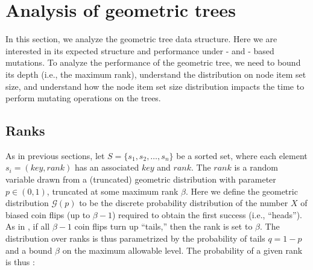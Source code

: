 \documentclass{article}
\begin{document}
\begin{algorithm}[!htb]
    \caption{Delete for geometric trees}\label{alg:delete-geometric}
    \DontPrintSemicolon

\end{algorithm}

\section{Analysis of geometric trees}

In this section, we analyze the geometric tree data structure. Here we are interested in its expected structure and performance under \zip- and \unzip- based mutations. To analyze the performance of the geometric tree, we need to bound its depth (i.e., the maximum rank), understand the distribution on node item set size, and understand how the node item set size distribution impacts the time to perform mutating operations on the trees.

\subsection{Ranks}

As in previous sections, let $S = \{s_1, s_2, \ldots, s_n\}$ be a sorted set, where each element $s_i = \left(key, rank \right)$ has an associated $key$ and $rank$. The $rank$ is a random variable drawn from a (truncated) geometric distribution with parameter $p \in \left(0, 1\right)$, truncated at some maximum rank $\beta$. Here we define the geometric distribution $\mathcal{G}(p)$ to be the discrete probability distribution of the number $X$ of biased coin flips (up to $\beta - 1$) required to obtain the first success (i.e., ``heads''). As in \cite{pugh1990skip}, if all $\beta - 1$ coin flips turn up ``tails,'' then the rank is set to $\beta$. The distribution over ranks is thus parametrized by the probability of tails $q = 1 - p$ and a bound $\beta$ on the maximum allowable level. The probability of a given rank is thus \cite{golovin2010b}:
\end{document}
